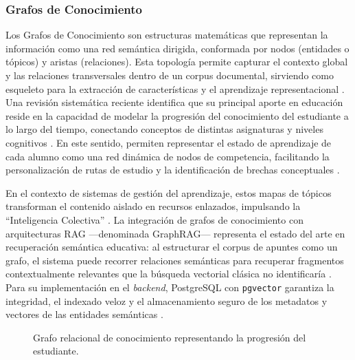 \subsubsection{Grafos de Conocimiento}

Los Grafos de Conocimiento son estructuras matemáticas que representan la información 
como una red semántica dirigida, conformada por nodos (entidades o tópicos) y aristas 
(relaciones). Esta topología permite capturar el contexto global y las relaciones 
transversales dentro de un corpus documental, sirviendo como esqueleto para la 
extracción de características y el aprendizaje representacional \textcite{Chen2023}. 
Una revisión sistemática reciente identifica que su principal aporte en educación 
reside en la capacidad de modelar la progresión del conocimiento del estudiante a lo 
largo del tiempo, conectando conceptos de distintas asignaturas y niveles cognitivos 
\parencite{AbuSalih2024}. En este sentido, permiten representar el estado de aprendizaje 
de cada alumno como una red dinámica de nodos de competencia, facilitando la 
personalización de rutas de estudio y la identificación de brechas conceptuales 
\parencite{SoumyaKrishnamoorthy2025}.

En el contexto de sistemas de gestión del aprendizaje, estos mapas de tópicos 
transforman el contenido aislado en recursos enlazados, impulsando la 
``Inteligencia Colectiva'' \parencite{Obionwu2022}. La integración de grafos de 
conocimiento con arquitecturas RAG —denominada GraphRAG— representa el estado del 
arte en recuperación semántica educativa: al estructurar el corpus de apuntes como 
un grafo, el sistema puede recorrer relaciones semánticas para recuperar fragmentos 
contextualmente relevantes que la búsqueda vectorial clásica no identificaría 
\parencite{EduGraphRAG2025}. Para su implementación en el \textit{backend}, 
PostgreSQL con \texttt{pgvector} garantiza la integridad, el indexado veloz y el 
almacenamiento seguro de los metadatos y vectores de las entidades semánticas 
\parencite{Afian2025, Upadhyay2026}.

\begin{figure}[H]
    \centering
    \caption{Grafo relacional de conocimiento representando la progresión del estudiante.}
    \label{fig:educational_knowledge_graph}
\end{figure}

